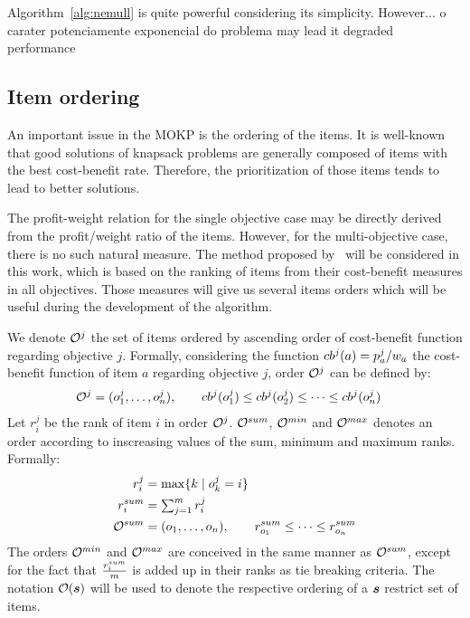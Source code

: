 Algorithm~\ref{alg:nemull} is quite powerful considering its simplicity.
However...
o carater potenciamente exponencial do problema may lead it
degraded performance

\subsection{Item ordering}
\label{subsec:order}
An important issue in the MOKP is the ordering of the items.
It is well-known that good solutions of knapsack problems
are generally composed of items with the best cost-benefit rate.
Therefore, the prioritization of those items tends to lead to better solutions.

The profit-weight relation for the single objective case may be directly derived
from the profit/weight ratio of the items.
However, for the multi-objective case, there is no such natural measure.
The method proposed by~\cite{bazgan2009} will be considered in this work,
which is based on the ranking of items from their cost-benefit measures in all objectives.
Those measures will give us several items orders which will be useful during
the development of the algorithm.

We denote $\mathcal{O}^j$ the set of items ordered by ascending order of cost-benefit function regarding objective $j$.
Formally, considering the function $cb^{j}(a) = {p^j_a}/{w_a}$ the
cost-benefit function of item $a$ regarding objective $j$, order
$\mathcal{O}^j$ can be defined by:
\begin{align*}
  \mathcal{O}^j &= (o^j_1, \ldots, o^j_n) , \qquad cb^{j}(o^j_1) \leq cb^{j}(o^j_2) \leq \cdots \leq cb^{j}(o^j_n)
\end{align*}
Let $r^j_i$ be the rank of item $i$ in order $\mathcal{O}^j$.
$\mathcal{O}^{sum}$, $\mathcal{O}^{min}$ and $\mathcal{O}^{max}$ denotes an order according to inscreasing values of the sum, minimum and maximum ranks.
Formally:
\begin{align*}
  r^j_i &= \max\{ k \;|\; o^j_k = i \} \\
  r^{sum}_i &= \textstyle\sum^m_{j=1} r^j_i \\
  \mathcal{O}^{sum} &= (o_1, \ldots, o_n) , \qquad r^{sum}_{o_1} \leq \cdots \leq r^{sum}_{o_n}
\end{align*}
The orders $\mathcal{O}^{min}$ and $\mathcal{O}^{max}$ are conceived in the same manner as
$\mathcal{O}^{sum}$, except for the fact that $\frac{r^{sum}_i}{m}$ is added up
in their ranks as tie breaking criteria.
The notation $\mathcal{O}(\boldsymbol{s})$ will be used to denote the respective ordering
of a $\boldsymbol{s}$ restrict set of items.

